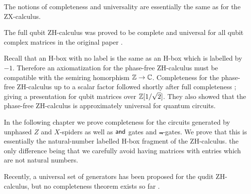 The notions of completeness and universality are essentially the same as for the ZX-calculus. 

The full qubit ZH-calculus was proved to be complete and universal for all qubit complex matrices in the original paper \cite{zh}.  

Recall that an H-box with no label is the same as an H-box which is labelled by $-1$.  Therefore an axiomatization for the phase-free ZH-calculus must be compatible with the semiring homorphism $\mathbb{Z}\to\mathbb{C}$.
Completeness for the phase-free ZH-calculus up to a scalar factor followed shortly after full completeness \cite{zhpi}; giving a presentation for qubit matrices over $\mathbb{Z}[1/\sqrt{2}]$.
They also showed that the  phase-free ZH-calculus is approximately universal for quantum circuits.

In the following chapter we prove completeness for the circuits generated by unphased $Z$ and $X$-spiders as well as ${\sf and}$ gates and $\Not$-gates.  We prove that this is essentially the natural-number labelled H-box fragment of the ZH-calculus. the only difference being that we carefully avoid having matrices with entries which are not natural numbers.

Recently, a universal set of generators has been proposed for the qudit ZH-calculus, but no completeness theorem exists so far \cite{roy}.




%
%
%
